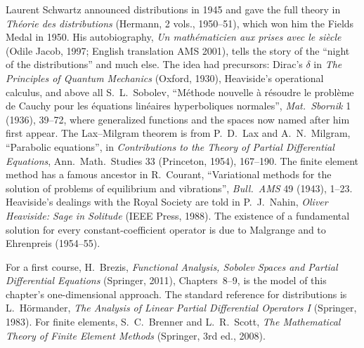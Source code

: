 Laurent Schwartz announced distributions in 1945 and gave the full theory in \emph{Th\'eorie des distributions} (Hermann, 2 vols., 1950--51), which won him the Fields Medal in 1950. His autobiography, \emph{Un math\'ematicien aux prises avec
le si\`ecle} (Odile Jacob, 1997; English translation AMS 2001), tells the story of the ``night of the distributions'' and much else. The idea had precursors: Dirac's $\delta$ in \emph{The Principles of Quantum Mechanics}
(Oxford, 1930), Heaviside's operational calculus, and above all S.~L.~Sobolev, ``M\'ethode nouvelle \`a r\'esoudre le probl\`eme de Cauchy pour les \'equations lin\'eaires hyperboliques normales'', \emph{Mat.\ Sbornik} 1 (1936),
39--72, where generalized functions and the spaces now named after him first appear. The Lax--Milgram theorem is from P.~D.~Lax and A.~N.~Milgram, ``Parabolic equations'', in \emph{Contributions to the Theory of Partial
Differential Equations}, Ann.\ Math.\ Studies 33 (Princeton, 1954), 167--190. The finite element method has a famous ancestor in R.~Courant, ``Variational methods for the solution of problems of equilibrium and vibrations'',
\emph{Bull.\ AMS} 49 (1943), 1--23. Heaviside's dealings with the Royal Society are told in P.~J.~Nahin, \emph{Oliver Heaviside: Sage in Solitude} (IEEE Press, 1988). The existence of a fundamental solution for every constant-coefficient operator is due to Malgrange and to Ehrenpreis (1954--55).

For a first course, H.~Brezis, \emph{Functional Analysis, Sobolev Spaces and Partial Differential Equations} (Springer, 2011), Chapters~8--9, is the model of this chapter's one-dimensional approach. The standard reference for distributions is
L.~H\"ormander, \emph{The Analysis of Linear Partial Differential Operators I} (Springer, 1983). For finite elements, S.~C.~Brenner and L.~R.~Scott, \emph{The Mathematical Theory of Finite Element Methods} (Springer, 3rd ed., 2008).
